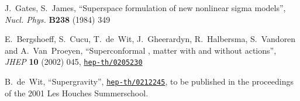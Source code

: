 \documentclass[a4paper,11pt,twoside]{article}
\begin{document}
\begin{thebibliography}{10}
{\sc J.~Gates, S.~James}, ``Superspace formulation of new nonlinear sigma
  models'',  {\sl Nucl. Phys.} {\bf B238} (1984)
349

{\sc E.~Bergshoeff, S.~Cucu, T.~de~Wit, J.~Gheerardyn, R.~Halbersma,
  S.~Vandoren  and A.~Van~Proeyen}, ``Superconformal \coordHE{}, \coordHE{} matter
  with and without actions'',  {\sl JHEP} {\bf 10} (2002) 045,
\href{http://www.arXiv.org/abs/hep-th/0205230}{{\tt hep-th/0205230}}

{\sc B.~de~Wit}, ``Supergravity'',
  \href{http://www.arXiv.org/abs/hep-th/0212245}{{\tt hep-th/0212245}},
to be published in the proceedings of the 2001 Les Houches Summerschool.

\end{thebibliography}\endgroup


\label{endxyzt}
\end{document}
